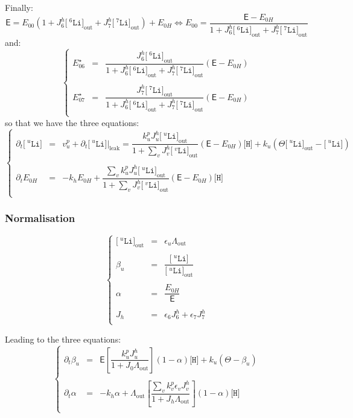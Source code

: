 \documentclass[aps,onecolumn,11pt]{revtex4}
\newcommand{\mychem}[1]{\mathtt{#1}}
\newcommand{\myconc}[1]{\big[#1\big]}
\newcommand{\spLi}[1]{{\!~^{#1}\mychem{Li}}}
\newcommand{\Li}[1]{\myconc{\spLi{#1}}}
\newcommand{\spproton}{\mychem{H}}
\newcommand{\proton}{\myconc{\spproton}}
\newcommand{\myleak}[1]{\left.{#1}\right\vert_{\mathrm{leak}}}
\newcommand{\myout}[1]{{#1}_{\mathrm{out}}}
\newcommand{\LiOut}[1]{\myout{\Li{#1}}}
\newcommand{\LiAll}{\Lambda}
\newcommand{\LiAllOut}{\myout{\LiAll}}
\begin{document}
Finally:
\begin{equation}
\mathsf{E} = E_{00}\left(1+J_6^h\LiOut{6}+J_7^h\LiOut{7}\right) + E_{0H} \Leftrightarrow E_{00} = \dfrac{\mathsf{E}-E_{0H}}{1+J_6^h\LiOut{6}+J_7^h\LiOut{7}}
\end{equation}
and:
\begin{equation}
\left\lbrace
\begin{array}{rcl}
	E_{06}^\star & = & \dfrac{J_6^h\LiOut{6}}{1+J_6^h\LiOut{6}+J_7^h\LiOut{7}} \left(\mathsf{E}-E_{0H}\right)\\
	\\
	E_{07}^\star & = & \dfrac{J_7^h\LiOut{7}}{1+J_6^h\LiOut{6}+J_7^h\LiOut{7}} \left(\mathsf{E}-E_{0H}\right)\\
\end{array}
\right.
\end{equation}
so that we have the three equations:
\begin{equation}
\left\lbrace
\begin{array}{rcl}
	\partial_t \Li{u}  & = & v^p_u +\partial_t \myleak{\Li{u}}  = \dfrac{k^p_u J_u^h \LiOut{u}}{1+\sum_v J_v^h \LiOut{v}} \left(\mathsf{E}-E_{0H}\right) \proton + k_u \left( \Theta \LiOut{u} - \Li{u}\right) \\
	\\
	\partial_t E_{0H} & = & -k_h E_{0H} + \dfrac{\sum_v k^p_u J_u^h \LiOut{u}}{1+\sum_v J_v^h \LiOut{v}} \left(\mathsf{E}-E_{0H}\right) \proton \\
\end{array}
\right.
\end{equation}
\subsubsection{Normalisation}
\begin{equation}
\left\lbrace
\begin{array}{rcl}
	\LiOut{u} & = & \epsilon_u \LiAllOut\\
	\\
	\beta_u & = & \dfrac{\Li{u}}{\LiOut{u}}\\
	\\
	\alpha  & = & \dfrac{E_{0H}}{\mathsf{E}}\\
	\\
	J_h & = & \epsilon_6 J_6^h  + \epsilon_7 J_7^h \\
\end{array}
\right.
\end{equation}

Leading to the three equations:
\begin{equation}
\left\lbrace
\begin{array}{rcl}
	\partial_t \beta_u & = & \mathsf{E} \left[\dfrac{k^p_u J_u^h}{1+J_0 \LiAllOut}\right] \left(1-\alpha\right) \proton
	 + k_u \left( \Theta - \beta_u\right)\\
	\\
	\partial_t \alpha  & = &  -k_h\alpha + \LiAllOut \left[\dfrac{ \sum_v k^p_v \epsilon_v J_v^h}{1+J_h\LiAllOut}\right] \left(1-\alpha\right) \proton\\
\end{array}
\right.
\end{equation}
\end{document}
